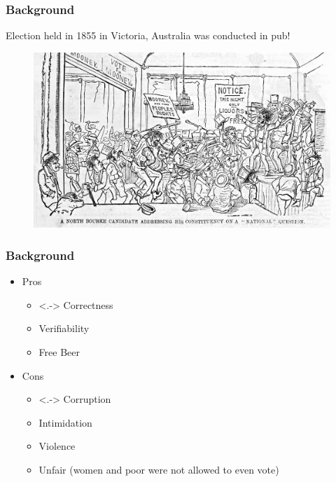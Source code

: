 \documentclass{beamer}
\begin{document}
\begin{frame}
\frametitle{Background}

{Election held in 1855 in Victoria, Australia 
	  was conducted in pub!}
\begin{figure}
	\begin{center}
	\includegraphics[scale=0.20]{NorthBourke.jpg}
	\end{center}
  \end{figure}   
\end{frame}

\begin{frame}
\frametitle{Background}
\begin{itemize}[]
\item Pros 
\begin{itemize}
\item<.-> Correctness
\item Verifiability
\item Free Beer
\end{itemize}
\item Cons
\begin{itemize}
\item<.-> Corruption
\item Intimidation
\item Violence
\item Unfair (women and poor were not allowed to even vote)
\end{itemize}
\end{itemize}
\end{frame}
\end{document}
